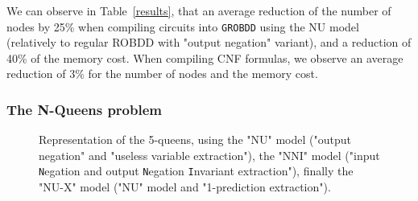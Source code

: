 \documentclass[a4paper,10pt]{article}
\newcommand{\includeframe}[4]{\makebox[#2\linewidth]{\texttt{[image: \#4]}}}
\newcommand{\NNIextract}{"input \texttt{N}egation and output \texttt{N}egation \texttt{I}nvariant extraction"}
\newcommand{\Xextract}{"1-prediction extraction"}
\newcommand{\GroBdd}{\texttt{GROBDD}}
\begin{document}
We can observe in Table~\ref{results}, that an average reduction of the number of nodes by 25\% when compiling circuits into \GroBdd{} using the NU model (relatively to regular ROBDD with "output negation" variant), and a reduction of 40\% of the memory cost.
When compiling CNF formulas, we observe an average reduction of 3\% for the number of nodes and the memory cost.

\subsubsection{The N-Queens problem}

\begin{figure}
\center
\includeframe{1}{0.9}{}{nqueens.pdf}
\caption{Representation of the 5-queens, using the "NU" model ("output negation" and "useless variable extraction"), the "NNI" model (\NNIextract), finally the "NU-X" model ("NU" model and \Xextract).
}
\label{figure-nqueens}
\end{figure}
\end{document}
